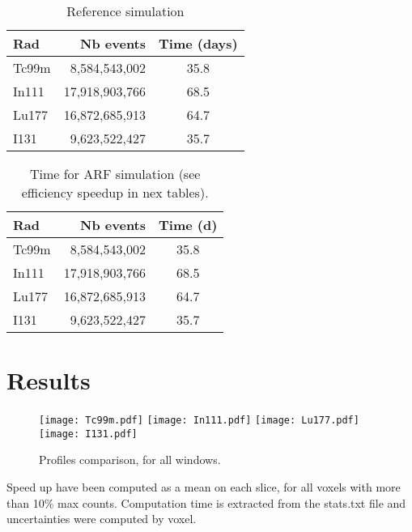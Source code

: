 \documentclass[11pt,final,a4paper]{article}
\begin{document}


\begin{table}[htbp]
  \centering
  \begin{tabular}[htbp]{lrc}
    Rad & Nb events & Time (days) \\\hline
    Tc99m & 8,584,543,002 & 35.8  \\
    In111 & 17,918,903,766 & 68.5  \\
    Lu177 & 16,872,685,913 & 64.7  \\
    I131 & 9,623,522,427 & 35.7  \\    
  \end{tabular}
  \caption{Reference simulation}
  \label{tab:ref_simu}  
\end{table}


\begin{table}[htbp]
  \centering
  \begin{tabular}[htbp]{lrc}
    Rad & Nb events & Time (d) \\\hline
    Tc99m & 8,584,543,002 & 35.8  \\
    In111 & 17,918,903,766 & 68.5  \\
    Lu177 & 16,872,685,913 & 64.7  \\
    I131 & 9,623,522,427 & 35.7  \\    
  \end{tabular}
  \caption{Time for ARF simulation (see efficiency speedup in nex tables).}
  \label{tab:ref_simu}  
\end{table}


\section{Results}


\begin{figure}[htbp]
  \begin{center}
    \texttt{[image: Tc99m.pdf]}
    \texttt{[image: In111.pdf]}
    \texttt{[image: Lu177.pdf]}
    \texttt{[image: I131.pdf]}
    \caption{Profiles comparison, for all windows.}
    \label{fig:profil}
  \end{center}
\end{figure}

Speed up have been computed as a mean on each slice, for all voxels
with more than 10\% max counts. Computation time is extracted from the
stats.txt file and uncertainties were computed by voxel.
\end{document}
